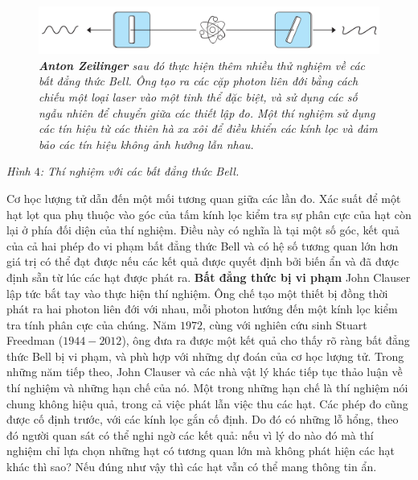 \begin{multicols}{2}
\begin{figure}[H]
		\vspace*{-10pt}
	\end{figure}
	\begin{figure}[H]
		\vspace*{-5pt}
		\centering
		\captionsetup{labelformat= empty, justification=centering}
		\includegraphics[width= 1\linewidth]{4}
		\caption{\small\textit{\color{timhieukhoahoc}\textbf{\color{timhieukhoahoc}Anton Zeilinger} sau đó thực hiện thêm nhiều thử nghiệm về các bất đẳng thức Bell. Ông tạo ra các cặp photon liên đới bằng cách chiếu một loại laser vào một tinh thể đặc biệt, và sử dụng các số ngẫu nhiên để chuyển giữa các thiết lập đo. Một thí nghiệm sử dụng các tín hiệu từ các thiên hà xa xôi để điều khiển các kính lọc và đảm bảo các tín hiệu không ảnh hưởng lẫn nhau.}}
		\vspace*{-10pt}
	\end{figure}
	\centerline{\small\textit{\color{timhieukhoahoc}Hình $4$: Thí nghiệm với các bất đẳng thức Bell.}}
	\vskip 0.15cm
	Cơ học lượng tử dẫn đến một mối tương quan giữa các lần đo. Xác suất để một hạt lọt qua phụ thuộc vào góc của tấm kính lọc kiểm tra sự phân cực của hạt còn lại ở phía đối diện của thí nghiệm. Điều này có nghĩa là tại một số góc, kết quả của cả hai phép đo vi phạm bất đẳng thức Bell và có hệ số tương quan lớn hơn giá trị có thể đạt được nếu các kết quả được quyết định bởi biến ẩn và đã được định sẵn từ lúc các hạt được phát ra.
	\vskip 0.1cm
	\textbf{\color{timhieukhoahoc}Bất đẳng thức bị vi phạm}
	\vskip 0.1cm
	John Clauser lập tức bắt tay vào thực hiện thí nghiệm. Ông chế tạo một thiết bị đồng thời phát ra hai photon liên đới với nhau, mỗi photon hướng đến một kính lọc kiểm tra tính phân cực của chúng. Năm $1972$, cùng với nghiên cứu sinh Stuart Freedman ($1944 - 2012$), ông đưa ra được một kết quả cho thấy rõ ràng bất đẳng thức Bell bị vi phạm, và phù hợp với những dự đoán của cơ học lượng tử.
	\vskip 0.1cm
	Trong những năm tiếp theo, John Clauser và các nhà vật lý khác tiếp tục thảo luận về thí nghiệm và những hạn chế của nó. Một trong những hạn chế là thí nghiệm nói chung không hiệu quả, trong cả việc phát lẫn việc thu các hạt. Các phép đo cũng được cố định trước, với các kính lọc gắn cố định. Do đó có những lỗ hổng, theo đó người quan sát có thể nghi ngờ các kết quả: nếu vì lý do nào đó mà thí nghiệm chỉ lựa chọn những hạt có tương quan lớn mà không phát hiện các hạt khác thì sao? Nếu đúng như vậy thì các hạt vẫn có thể mang thông tin ẩn.

\end{multicols}
